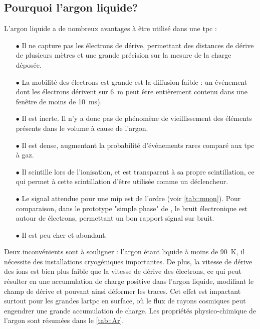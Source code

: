     \subsection{Pourquoi l'argon liquide?}
      L'argon liquide a de nombreux avantages à être utilisé dans une \gls{tpc}\cite{Rubbia1977} :
      \begin{itemize}
        \item[$\bullet$] Il ne capture pas les électrons de dérive, permettant des distances de dérive de plusieurs mètres et une grande précision sur la mesure de la charge déposée.
        \item[$\bullet$] La mobilité des électrons est grande est la diffusion faible : un événement dont les électrons dérivent sur \SI{6}{\meter} peut être entièrement contenu dans une fenêtre de moins de \SI{10}{\milli\second}).
        \item[$\bullet$] Il est inerte. Il n'y a donc pas de phénomène de vieillissement des éléments présents dans le volume à cause de l'argon.
        \item[$\bullet$] Il est dense, augmentant la probabilité d'événements rares comparé aux \gls{tpc} à gaz.
        \item[$\bullet$] Il scintille lors de l'ionisation, et est transparent à sa propre scintillation, ce qui permet à cette scintillation d'être utilisée comme un déclencheur.
        \item[$\bullet$] Le signal attendue pour une \gls{mip} est de l'ordre  (voir \autoref{tab::muon}). Pour comparaison, dans le prototype "simple phase" de \protosp{}, le bruit électronique est autour de  électrons, permettant un bon rapport signal sur bruit.
        \item[$\bullet$] Il est peu cher et abondant.
      \end{itemize}
      Deux inconvénients sont à souligner : l'argon étant liquide à moins de \SI{90}{\kelvin}, il nécessite des installations cryogéniques importantes. De plus, la vitesse de dérive des ions est bien plus faible que la vitesse de dérive des électrons, ce qui peut résulter en une accumulation de charge positive dans l'argon liquide, modifiant le champ de dérive et pouvant ainsi déformer les traces. Cet effet est impactant surtout pour les grandes \gls{lartpc} en surface, où le flux de rayons cosmiques peut engendrer une grande accumulation de charge. Les propriétés physico-chimique de l'argon sont résumées dans le \autoref{tab::Ar}.
